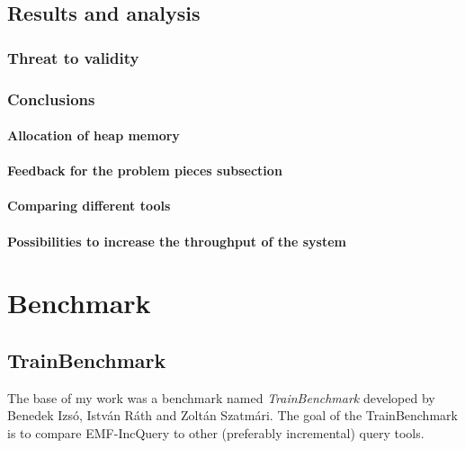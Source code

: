 \section{Results and analysis}

\subsection{Threat to validity}

\subsection{Conclusions}

\subsubsection{Allocation of heap memory}

\subsubsection{Feedback for the problem pieces subsection}

\subsubsection{Comparing different tools}

\subsubsection{Possibilities to increase the throughput of the system}










\chapter{Benchmark}

\section{TrainBenchmark}

The base of my work was a benchmark named \textit{TrainBenchmark} developed by Benedek Izsó, István Ráth and Zoltán Szatmári. The goal of the TrainBenchmark is to compare EMF-IncQuery \cite{incquery} to other (preferably incremental) query tools.

